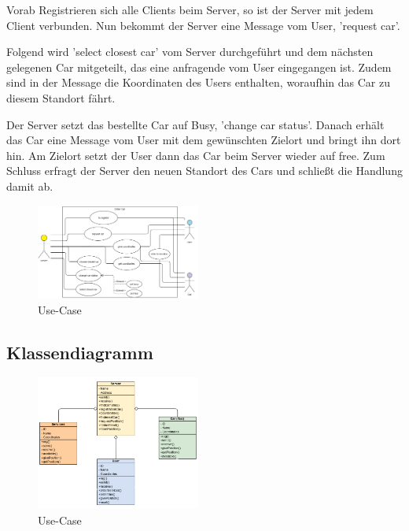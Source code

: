 Vorab Registrieren sich alle Clients beim Server, so ist der Server mit jedem Client verbunden. Nun bekommt der Server eine Message vom User, 'request car'.

Folgend wird 'select closest car' vom Server durchgeführt und dem nächsten gelegenen Car mitgeteilt, das eine anfragende vom User eingegangen ist. Zudem sind in der Message die Koordinaten des Users enthalten, woraufhin das Car zu diesem Standort fährt.

Der Server setzt das bestellte Car auf Busy, 'change car status'.
Danach erhält das Car eine Message vom User mit dem gewünschten Zielort und bringt ihn dort hin. Am Zielort setzt der User dann das Car beim Server wieder auf free. Zum Schluss erfragt der Server den neuen Standort des Cars und schließt die Handlung damit ab.


\begin{figure}[htbp] 
  \centering
     \includegraphics[width=0.48\textwidth]{Use-Case_Server.png}
     \caption{Use-Case}
\end{figure}

\subsection{Klassendiagramm}


\begin{figure}[htbp] 
  \centering
     \includegraphics[width=0.48\textwidth]{Class_diagramm.png}
     \caption{Use-Case}
\end{figure}
